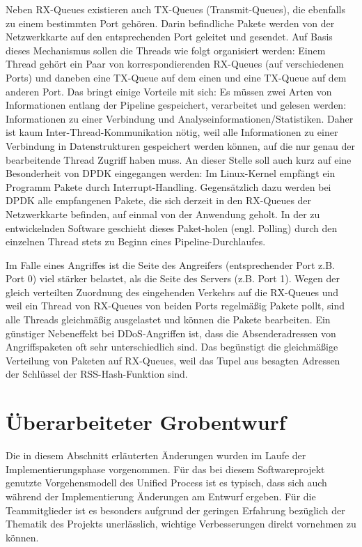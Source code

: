 \documentclass[../review_3.tex]{subfiles}
\begin{document}
Neben RX-Queues existieren auch TX-Queues (Transmit-Queues), die ebenfalls zu einem bestimmten Port gehören. Darin befindliche Pakete werden von der Netzwerkkarte auf den entsprechenden Port geleitet und gesendet. Auf Basis dieses Mechanismus sollen die Threads wie folgt organisiert werden: Einem Thread gehört ein Paar von korrespondierenden RX-Queues (auf verschiedenen Ports) und daneben eine TX-Queue auf dem einen und eine TX-Queue auf dem anderen Port. Das bringt einige Vorteile mit sich: Es müssen zwei Arten von Informationen entlang der Pipeline gespeichert, verarbeitet und gelesen werden: Informationen zu einer Verbindung und Analyseinformationen/Statistiken. Daher ist kaum Inter-Thread-Kommunikation nötig, weil alle Informationen zu einer Verbindung in Datenstrukturen gespeichert werden können, auf die nur genau der bearbeitende Thread Zugriff haben muss. An dieser Stelle soll auch kurz auf eine Besonderheit von DPDK eingegangen werden: Im Linux-Kernel empfängt ein Programm Pakete durch Interrupt-Handling. Gegensätzlich dazu werden bei DPDK alle empfangenen Pakete, die sich derzeit in den RX-Queues der Netzwerkkarte befinden, auf einmal von der Anwendung geholt. In der zu entwickelnden Software geschieht dieses Paket-holen (engl. \glqq Polling\grqq{}) durch den einzelnen Thread stets zu Beginn eines Pipeline-Durchlaufes.

Im Falle eines Angriffes ist die Seite des Angreifers (entsprechender Port z.B. \glqq Port 0\grqq{}) viel stärker belastet, als die Seite des Servers (z.B. \glqq Port 1\grqq{}). Wegen der gleich verteilten Zuordnung des eingehenden Verkehrs auf die RX-Queues und weil ein Thread von RX-Queues von beiden Ports regelmäßig Pakete pollt, sind alle Threads gleichmäßig ausgelastet und können die Pakete bearbeiten. Ein günstiger Nebeneffekt bei DDoS-Angriffen ist, dass die Absenderadressen von Angriffspaketen oft sehr unterschiedlich sind. Das begünstigt die gleichmäßige Verteilung von Paketen auf RX-Queues, weil das Tupel aus besagten Adressen der Schlüssel der RSS-Hash-Funktion sind.

\section{Überarbeiteter Grobentwurf}
Die in diesem Abschnitt erläuterten Änderungen wurden im Laufe der Implementierungsphase vorgenommen. Für das bei diesem Softwareprojekt genutzte Vorgehensmodell des Unified Process ist es typisch, dass sich auch während der Implementierung Änderungen am Entwurf ergeben. Für die Teammitglieder ist es besonders aufgrund der geringen Erfahrung bezüglich der Thematik des Projekts unerlässlich, wichtige Verbesserungen direkt vornehmen zu können.
\end{document}
